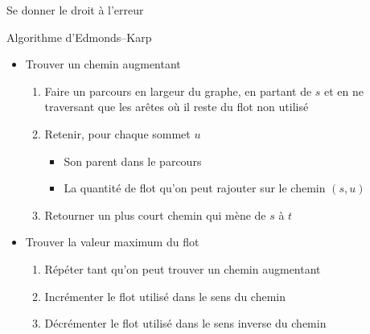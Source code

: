 \documentclass{main}
\begin{document}
\begin{frame}{Se donner le droit à l’erreur}
\end{frame}

\begin{frame}{Algorithme d’Edmonds–Karp}
    \begin{itemize}
        \item Trouver un chemin augmentant
        \begin{enumerate}
            \item Faire un parcours en largeur du graphe, en partant de $s$ et en ne traversant que les arêtes où il reste du flot non utilisé
            \item Retenir, pour chaque sommet $u$
            \begin{itemize}
                \item Son parent dans le parcours
                \item La quantité de flot qu’on peut rajouter sur le chemin $(s, u)$
            \end{itemize}
            \item Retourner un plus court chemin qui mène de $s$ à $t$
        \end{enumerate}
        
        \item Trouver la valeur maximum du flot
        \begin{enumerate}
            \item Répéter tant qu’on peut trouver un chemin augmentant
            \item Incrémenter le flot utilisé dans le sens du chemin
            \item Décrémenter le flot utilisé dans le sens inverse du chemin
        \end{enumerate}
    \end{itemize}
\end{frame}
\end{document}
